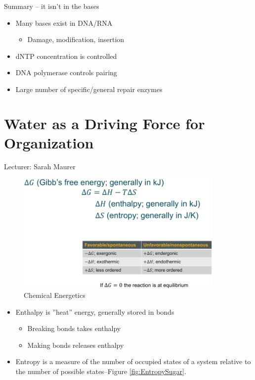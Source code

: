 \documentclass[]{article}
\begin{document}
Summary – it isn’t in the bases
\begin{itemize}
	\item Many bases exist in DNA/RNA
	\begin{itemize}
		\item Damage, modification, insertion
	\end{itemize}
	\item dNTP concentration is controlled
	\item DNA polymerase controls	pairing
	\item Large number of specific/general repair enzymes
\end{itemize}
\cite{kunkel2004dna}

\section{Water as a Driving Force for Organization}

Lecturer: Sarah Maurer

\begin{figure}[H]
	\caption{Chemical Energetics} \label{fig:ChemicalEnergetics} 
	\includegraphics[width=0.9\textwidth]{ChemicalEnergetics}
\end{figure}

\begin{itemize}
	\item  Enthalpy is ”heat” energy, generally stored in bonds
	\begin{itemize}
		\item Breaking bonds takes enthalpy
		\item Making bonds releases enthalpy
	\end{itemize}
	\item Entropy is a measure of the number of occupied states of a system relative to the number of possible	states--Figure \ref{fig:EntropySugar}.
\end{itemize}
\end{document}

